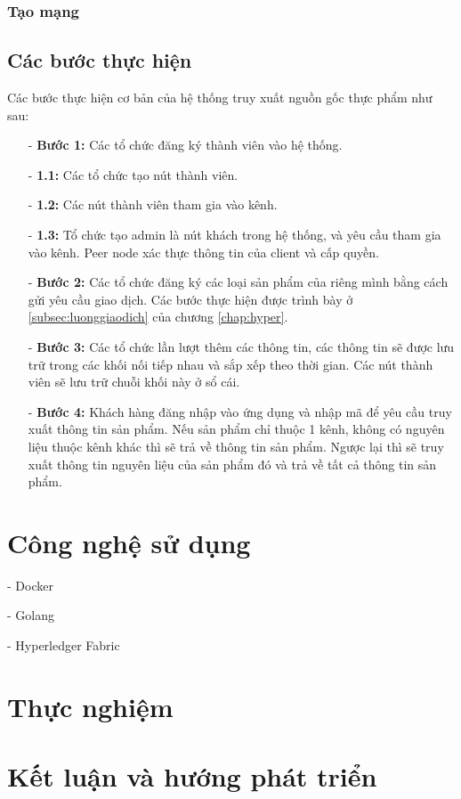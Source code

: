 \subsubsection{Tạo mạng}
\subsection{Các bước thực hiện}
Các bước thực hiện cơ bản của hệ thống truy xuất nguồn gốc thực phẩm như sau:
\begin{itemize}
    \item[-] \textbf{Bước 1:} Các tổ chức đăng ký thành viên vào hệ thống.
        \item[-] \textbf{1.1:} Các tổ chức tạo nút thành viên. 
        \item[-] \textbf{1.2:} Các nút thành viên tham gia vào kênh.
        \item[-] \textbf{1.3:} Tổ chức tạo admin là nút khách trong hệ thống, và yêu cầu
        tham gia vào kênh. Peer node xác thực thông tin của client và cấp quyền.
    \item[-] \textbf{Bước 2:} Các tổ chức đăng ký các loại sản phẩm của riêng mình bằng cách 
    gửi yêu cầu giao dịch. Các bước thực hiện được trình bày ở \ref{subsec:luonggiaodich} của chương \ref{chap:hyper}.
    \item[-] \textbf{Bước 3:} Các tổ chức lần lượt thêm các thông tin, các thông tin sẽ được
    lưu trữ trong các khối nối tiếp nhau và sắp xếp theo thời gian. Các nút thành viên sẽ lưu 
    trữ chuỗi khối này ở sổ cái.
    \item[-] \textbf{Bước 4:} Khách hàng đăng nhập vào ứng dụng và nhập mã để yêu cầu truy xuất
    thông tin sản phẩm. Nếu sản phẩm chỉ thuộc 1 kênh, không có nguyên liệu thuộc kênh
    khác thì sẽ trả về thông tin sản phẩm. Ngược lại thì sẽ truy xuất thông tin nguyên liệu
    của sản phẩm đó và trả về tất cả thông tin sản phẩm.
\end{itemize}


\section{Công nghệ sử dụng}
- Docker

- Golang

- Hyperledger Fabric

\section{Thực nghiệm}

\section{Kết luận và hướng phát triển}